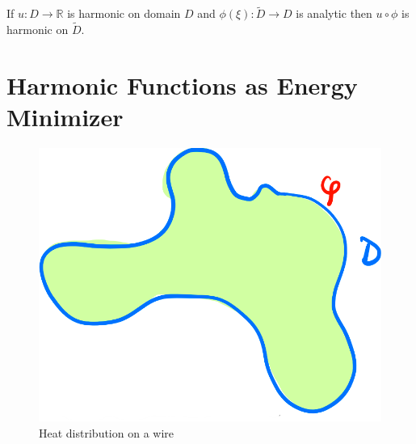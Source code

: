 \begin{lemma}
    If $u: D \to \mathbb{R}$ is harmonic on domain $D$ and $\phi (\xi) : \tilde{D} \rightarrow D$ is analytic then $u \circ \phi$ is harmonic on $\tilde{D}$.
\end{lemma}

\section{Harmonic Functions as Energy Minimizer}
\begin{figure}[H]
    \centering
    \includegraphics[scale=0.5]{LECTURE_20/domain.png}
    \caption{Heat distribution on a wire}
\end{figure}
